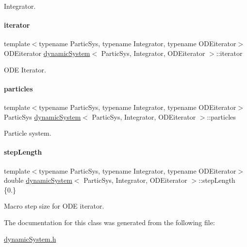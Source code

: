 Integrator. 

\mbox{\label{classdynamic_system_a4c308ab0538e69020fe50d1b53f94d25}} 
\paragraph{\texorpdfstring{iterator}{iterator}}
{\footnotesize\ttfamily template$<$typename Partic\+Sys, typename Integrator, typename O\+D\+Eiterator$>$ \\
O\+D\+Eiterator \mbox{\hyperlink{classdynamic_system}{dynamic\+System}}$<$ Partic\+Sys, Integrator, O\+D\+Eiterator $>$\+::iterator}



O\+DE Iterator. 

\mbox{\label{classdynamic_system_aa61069ee367b9d1bb5bd2fedadba28fb}} 
\paragraph{\texorpdfstring{particles}{particles}}
{\footnotesize\ttfamily template$<$typename Partic\+Sys, typename Integrator, typename O\+D\+Eiterator$>$ \\
Partic\+Sys \mbox{\hyperlink{classdynamic_system}{dynamic\+System}}$<$ Partic\+Sys, Integrator, O\+D\+Eiterator $>$\+::particles}



Particle system. 

\mbox{\label{classdynamic_system_a0933282b8562cde1882defb383077c53}} 
\paragraph{\texorpdfstring{step\+Length}{stepLength}}
{\footnotesize\ttfamily template$<$typename Partic\+Sys, typename Integrator, typename O\+D\+Eiterator$>$ \\
double \mbox{\hyperlink{classdynamic_system}{dynamic\+System}}$<$ Partic\+Sys, Integrator, O\+D\+Eiterator $>$\+::step\+Length \{0.\}}



Macro step size for O\+DE iterator. 



The documentation for this class was generated from the following file\+:\begin{DoxyCompactItemize}
\item 
\mbox{\hyperlink{dynamic_system_8h}{dynamic\+System.\+h}}\end{DoxyCompactItemize}
